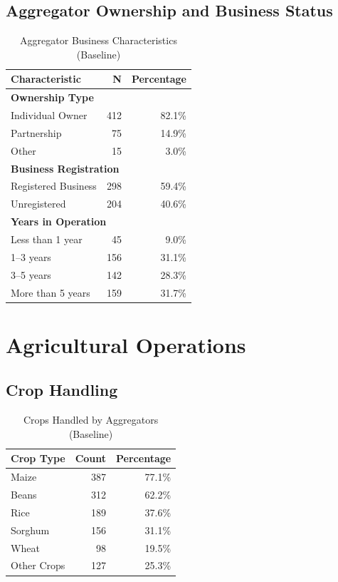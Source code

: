 \documentclass[11pt]{article}
\begin{document}
\subsection{Aggregator Ownership and Business Status}

\begin{table}[h!]
\centering
\caption{Aggregator Business Characteristics (Baseline)}
\label{tab:aggregator_char}
\begin{tabularx}{0.9\textwidth}{lrr}
\toprule
\textbf{Characteristic} & \textbf{N} & \textbf{Percentage} \\
\midrule
\multicolumn{3}{l}{\textbf{Ownership Type}} \\
Individual Owner & 412 & 82.1\% \\
Partnership & 75 & 14.9\% \\
Other & 15 & 3.0\% \\
\midrule
\multicolumn{3}{l}{\textbf{Business Registration}} \\
Registered Business & 298 & 59.4\% \\
Unregistered & 204 & 40.6\% \\
\midrule
\multicolumn{3}{l}{\textbf{Years in Operation}} \\
Less than 1 year & 45 & 9.0\% \\
1--3 years & 156 & 31.1\% \\
3--5 years & 142 & 28.3\% \\
More than 5 years & 159 & 31.7\% \\
\bottomrule
\end{tabularx}
\end{table}

\section{Agricultural Operations}

\subsection{Crop Handling}

\begin{table}[h!]
\centering
\caption{Crops Handled by Aggregators (Baseline)}
\label{tab:crops}
\begin{tabularx}{0.8\textwidth}{lrr}
\toprule
\textbf{Crop Type} & \textbf{Count} & \textbf{Percentage} \\
\midrule
Maize & 387 & 77.1\% \\
Beans & 312 & 62.2\% \\
Rice & 189 & 37.6\% \\
Sorghum & 156 & 31.1\% \\
Wheat & 98 & 19.5\% \\
Other Crops & 127 & 25.3\% \\
\bottomrule
\end{tabularx}
\end{table}
\end{document}
